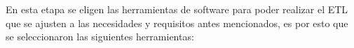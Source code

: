 En esta etapa se eligen las herramientas de software para poder realizar el ETL que se ajusten a las necesidades y requisitos antes mencionados, es por esto que se seleccionaron las siguientes herramientas:
